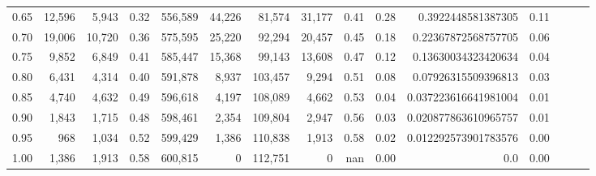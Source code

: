 \begin{tabular}{rrrrrrrrrrrrrrr}
0.65 &  12,596 &   5,943 &  0.32 &  556,589 &   44,226 &   81,574 &   31,177 &  0.41 &  0.28 &    0.3922448581387305 &      0.11 \\
0.70 &  19,006 &  10,720 &  0.36 &  575,595 &   25,220 &   92,294 &   20,457 &  0.45 &  0.18 &   0.22367872568757705 &      0.06 \\
0.75 &   9,852 &   6,849 &  0.41 &  585,447 &   15,368 &   99,143 &   13,608 &  0.47 &  0.12 &   0.13630034323420634 &      0.04 \\
0.80 &   6,431 &   4,314 &  0.40 &  591,878 &    8,937 &  103,457 &    9,294 &  0.51 &  0.08 &   0.07926315509396813 &      0.03 \\
0.85 &   4,740 &   4,632 &  0.49 &  596,618 &    4,197 &  108,089 &    4,662 &  0.53 &  0.04 &  0.037223616641981004 &      0.01 \\
0.90 &   1,843 &   1,715 &  0.48 &  598,461 &    2,354 &  109,804 &    2,947 &  0.56 &  0.03 &  0.020877863610965757 &      0.01 \\
0.95 &     968 &   1,034 &  0.52 &  599,429 &    1,386 &  110,838 &    1,913 &  0.58 &  0.02 &  0.012292573901783576 &      0.00 \\
1.00 &   1,386 &   1,913 &  0.58 &  600,815 &        0 &  112,751 &        0 &   nan &  0.00 &                   0.0 &      0.00 \\
\bottomrule
\end{tabular}
